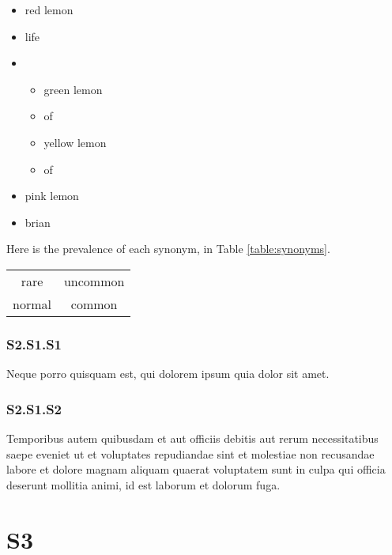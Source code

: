 \documentclass{article}
\begin{document}
\begin{itemize}
    \label{list:mylist}
    \item red lemon
    \item life
    \item
    \begin{itemize}
        \item green lemon
        \item of
    \end{itemize}
    \begin{itemize}
        \item yellow lemon
        \item of
    \end{itemize}
\end{itemize}

\begin{itemize}
    \label{list:mylist}
    \item pink lemon
    \item brian
\end{itemize}
Here is the prevalence of each synonym, in Table \ref{table:synonyms}.

\begin{tabular}{c c}
    \label{table:synonyms}
    rare & uncommon \\
    normal & common
\end{tabular}



\subsubsection{S2.S1.S1}
Neque porro quisquam est, qui dolorem ipsum quia dolor sit amet.

\subsubsection{S2.S1.S2}
Temporibus autem quibusdam et aut officiis debitis aut rerum necessitatibus saepe eveniet ut et voluptates repudiandae sint et molestiae non recusandae labore et dolore magnam aliquam quaerat voluptatem sunt in culpa qui officia deserunt mollitia animi, id est laborum et dolorum fuga.

\section{S3}
\label{sec:S3}
\end{document}
